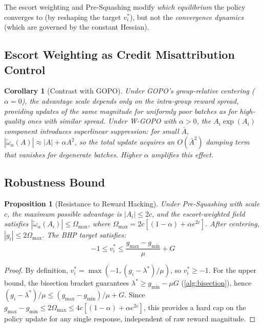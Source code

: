 \documentclass[11pt]{article}
\newtheorem{proposition}[theorem]{Proposition}
\newtheorem{corollary}[theorem]{Corollary}
\theoremstyle{definition}
\theoremstyle{remark}
\begin{document}
The escort weighting and Pre-Squashing modify \emph{which equilibrium} the policy converges to (by reshaping the target $v_i^*$), but not the \emph{convergence dynamics} (which are governed by the constant Hessian).

\subsection{Escort Weighting as Credit Misattribution Control}

\begin{corollary}[Contrast with GOPO]
\label{cor:contrast}
Under GOPO's group-relative centering ($\alpha = 0$), the advantage scale depends only on the intra-group reward spread, providing updates of the same magnitude for uniformly poor batches as for high-quality ones with similar spread. Under W-GOPO with $\alpha > 0$, the $A_i \exp(A_i)$ component introduces superlinear suppression: for small $\bar{A}$, $|\tilde{\omega}_\alpha(A)| \approx |A| + \alpha A^2$, so the total update acquires an $O(\bar{A}^2)$ damping term that vanishes for degenerate batches. Higher $\alpha$ amplifies this effect.
\end{corollary}

\subsection{Robustness Bound}

\begin{proposition}[Resistance to Reward Hacking]
\label{prop:reward_hack}
Under Pre-Squashing with scale $c$, the maximum possible advantage is $|A_i| \leq 2c$, and the escort-weighted field satisfies $|\tilde{\omega}_\alpha(A_i)| \leq \Omega_{\max}$, where $\Omega_{\max} = 2c[(1-\alpha) + \alpha e^{2c}]$. After centering, $|g_i| \leq 2\Omega_{\max}$. The BHP target satisfies:
\begin{equation}
    -1 \leq v_i^* \leq \frac{g_{\max} - g_{\min}}{\mu} + G
\end{equation}
\end{proposition}
\begin{proof}
By definition, $v_i^* = \max(-1, (g_i - \lambda^*)/\mu)$, so $v_i^* \geq -1$. For the upper bound, the bisection bracket guarantees $\lambda^* \geq g_{\min} - \mu G$ (\cref{alg:bisection}), hence $(g_i - \lambda^*)/\mu \leq (g_{\max} - g_{\min})/\mu + G$. Since $g_{\max} - g_{\min} \leq 2\Omega_{\max} \leq 4c[(1-\alpha) + \alpha e^{2c}]$, this provides a hard cap on the policy update for any single response, independent of raw reward magnitude.
\end{proof}
\end{document}
